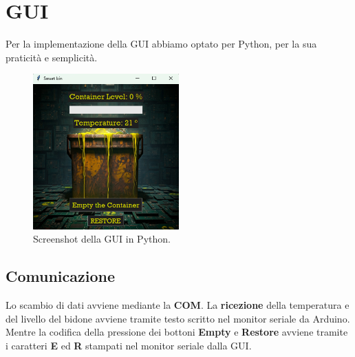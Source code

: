 \documentclass[a4paper,12pt]{report}
\begin{document}
\section{GUI}
Per la implementazione della GUI abbiamo optato per Python,
per la sua praticità e semplicità. \\
\begin{figure}[H] %
    \centering
    \includegraphics[width=0.5\textwidth]{images/gui.png}
    \caption{Screenshot della GUI in Python.}
    \label{fig:sample-image} %
\end{figure}

\subsection{Comunicazione}
Lo scambio di dati avviene mediante la \textbf{COM}.
La \textbf{ricezione} della temperatura e del livello del bidone avviene tramite testo scritto nel monitor seriale da Arduino.
Mentre la codifica della pressione dei bottoni \textbf{Empty} e \textbf{Restore} avviene tramite i caratteri \textbf{E} ed \textbf{R} stampati nel monitor seriale dalla GUI.
\end{document}
